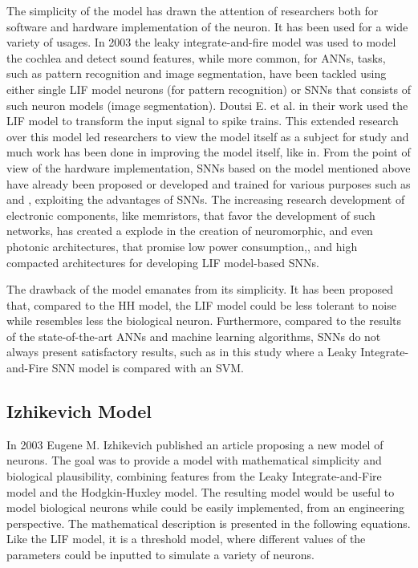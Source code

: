\documentclass[12pt]{report}
\begin{document}
\medskip

The simplicity of the model has drawn the attention of researchers both for software and hardware implementation of the neuron. It has been used for a wide variety of usages. In 2003 the leaky integrate-and-fire model was used to model the cochlea and detect sound features\cite{sound2003}, while more common, for ANNs, tasks, such as pattern recognition and image segmentation, have been tackled using either single LIF model neurons (for pattern recognition)\cite{pattern2007} or SNNs that consists of such neuron models (image segmentation)\cite{Chaturvedi2012}. Doutsi E. et al. in their work\cite{Doutsi2021} used the LIF model to transform the input signal to spike trains. This extended research over this model led researchers to view the model itself as a subject for study and much work has been done in improving the model itself, like in\cite{Mullowney2008}. From the point of view of the hardware implementation, SNNs based on the model mentioned above have already been proposed or developed and trained for various purposes such as\cite{Liu2019} and \cite{Chu2015}, exploiting the advantages of SNNs. The increasing research development of electronic components, like memristors, that favor the development of such networks\cite{Yang2020}, has created a explode in the creation of neuromorphic, and even photonic architectures\cite{Nahmias2013}, that promise low power consumption\cite{Liu2019},\cite{Chatterjee2019}, and high compacted architectures\cite{Rozenberg2019} for developing LIF model-based SNNs. 

The drawback of the model emanates from its simplicity. It has been proposed that, compared to the HH model, the LIF model could be less tolerant to noise while resembles less the biological neuron\cite{subthreshold2005}. Furthermore, compared to the results of the state-of-the-art ANNs and machine learning algorithms, SNNs do not always present satisfactory results, such as in this study\cite{SVM2014} where a Leaky Integrate-and-Fire SNN model is compared with an SVM.

\medskip

\subsection{Izhikevich Model}

In 2003 Eugene M. Izhikevich published an article proposing a new model of neurons\cite{Izhikevich2003}. The goal was to provide a model with mathematical simplicity and biological plausibility, combining features from the Leaky Integrate-and-Fire model and the Hodgkin-Huxley model. The resulting model would be useful to model biological neurons while could be easily implemented, from an engineering perspective. The mathematical description is presented in the following equations. Like the LIF model, it is a threshold model, where different values of the parameters could be inputted to simulate a variety of neurons.
\end{document}
